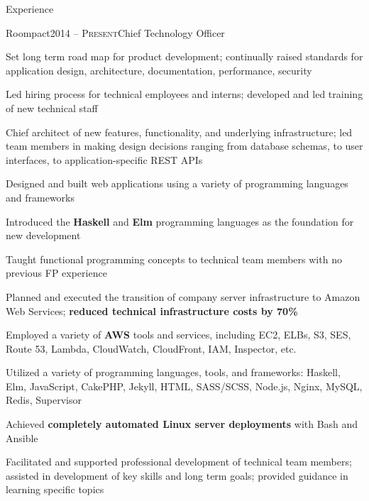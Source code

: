 \documentclass{resume} %
\begin{document}

\begin{rSection}{Experience}
\begin{rSubsection}{Roompact}{\textsc{2014 -- Present}}{Chief Technology Officer}{}
\item Set long term road map for product development; continually raised standards for application design, architecture, documentation, performance, security
\item Led hiring process for technical employees and interns; developed and led training of new technical staff
\item Chief architect of new features, functionality, and underlying infrastructure; led team members in making design decisions ranging from database schemas,  to user interfaces, to application-specific REST APIs
\item Designed and built web applications using a variety of programming languages and frameworks
\item Introduced the \textbf{Haskell} and \textbf{Elm} programming languages as the foundation for new development
\item Taught functional programming concepts to technical team members with no previous FP experience
\item Planned and executed the transition of company server infrastructure to Amazon Web Services; \textbf{reduced technical infrastructure costs by 70\%}
\item Employed a variety of \textbf{AWS} tools and services, including EC2, ELBs, S3, SES, Route 53, Lambda, CloudWatch, CloudFront, IAM, Inspector, etc.
\item Utilized a variety of programming languages, tools, and frameworks: Haskell, Elm, JavaScript, CakePHP, Jekyll, HTML, SASS/SCSS, Node.js, Nginx, MySQL, Redis, Supervisor
\item Achieved \textbf{completely automated Linux server deployments} with Bash and Ansible
\item Facilitated and supported professional development of technical team members; assisted in development of key skills and long term goals; provided guidance in learning specific topics
\end{rSubsection}



\end{rSection}
\end{document}
